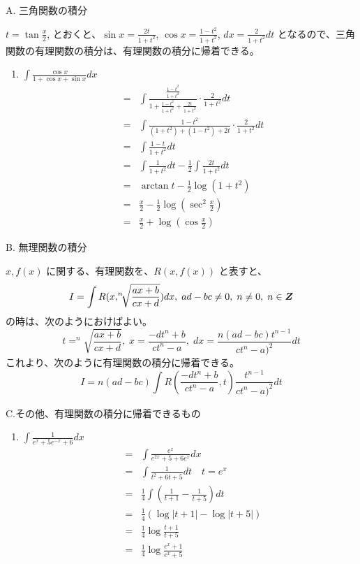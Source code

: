 \newpage{}
A. {\gt 三角関数の積分}

$t = \tan\frac{x}2$, とおくと、$\sin x = \frac{2t}{1+t^2}$, $\cos x = \frac{1-t^2}{1+t^2}$, $dx = \frac{2}{1+t^2}dt$ となるので、三角関数の有理関数の積分は、有理関数の積分に帰着できる。

\begin{eg}
\begin{enumerate}
\item ${\displaystyle \int\frac{\cos x}{1+\cos x + \sin x}dx}$
\begin{eqnarray*}
\mbox{} & = & \int\frac{\frac{1-t^2}{1+t^2}}{1+\frac{1-t^2}{1+t^2}+\frac{2t}{1+t^2}}\cdot\frac{2}{1+t^2}dt\\
& = & \int\frac{1-t^2}{(1+t^2)+(1-t^2)+2t}\cdot\frac{2}{1+t^2}dt\\
& = & \int\frac{1-t}{1+t^2}dt\\
& = & \int\frac{1}{1+t^2}dt - \frac{1}{2}\int\frac{2t}{1+t^2}dt\\
& = & \arctan t - \frac{1}{2}\log(1+t^2)\\
& = & \frac{x}{2} - \frac{1}{2}\log(\sec^2\frac{x}{2})\\
& = & \frac{x}{2} + \log(\cos\frac{x}{2})
\end{eqnarray*}
\end{enumerate}
\end{eg}

\medskip
B. {\gt 無理関数の積分}

$x, f(x)$ に関する、有理関数を、$R(x,f(x))$ と表すと、
$$I = \int R(x,^n\!\!\sqrt{\frac{ax+b}{cx+d}})dx,\; ad-bc\neq 0, \;n\neq 0, \;n\in \mbox{\boldmath $Z$}$$
の時は、次のようにおけばよい。
$$t = ^n\!\!\sqrt{\frac{ax+b}{cx+d}}, \; x = \frac{-dt^n+b}{ct^n-a},\; dx = \frac{n(ad-bc)t^{n-1}}{ct^n-a)^2}dt$$
これより、次のように有理関数の積分に帰着できる。
$$I = n(ad-bc)\int R(\frac{-dt^n+b}{ct^n-a}, t)\frac{t^{n-1}}{ct^n-a)^2}dt$$

\medskip
C.{\gt その他、有理関数の積分に帰着できるもの}
\begin{eg}
\begin{enumerate}
\item ${\displaystyle \int\frac{1}{e^x+5e^{-x}+6}dx}$
\begin{eqnarray*}
\mbox{} & = & \int\frac{e^x}{e^{2x} + 5 + 6e^x}dx\\
	& = & \int\frac{1}{t^2+6t+5}dt \quad t = e^x\\
	& = & \frac14\int\left(\frac1{t+1}-\frac{1}{t+5}\right)dt\\
	& = & \frac14(\log|t+1| - \log|t+5|)\\
	& = & \frac14\log\frac{t+1}{t+5}\\
	& = & \frac14\log\frac{e^x+1}{e^x+5}
\end{eqnarray*}
\end{enumerate}
\end{eg}

